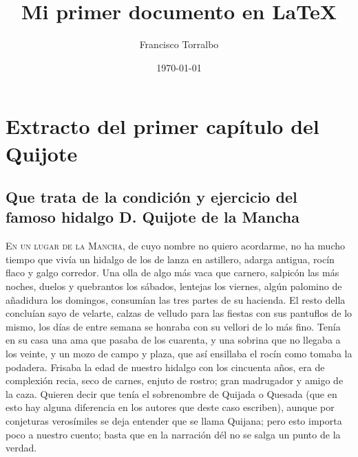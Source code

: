 \documentclass[a4paper, 12pt, twoside]{article} %
\title{Mi primer documento en \LaTeX}
\author{Francisco Torralbo}
\date{\today}
\begin{document}
\maketitle

\section{Extracto del primer capítulo del Quijote}

\subsection*{Que trata de la condición y ejercicio del famoso hidalgo D. Quijote de la Mancha}

\textsc{En un lugar de la Mancha}, de cuyo nombre no quiero acordarme, no ha mucho tiempo que vivía un hidalgo de los de lanza en astillero, adarga antigua, rocín flaco y galgo corredor. Una olla de algo más vaca que carnero, salpicón las más noches, duelos y quebrantos los sábados, lentejas los viernes, algún palomino de añadidura los domingos, consumían las tres partes de su hacienda. El resto della concluían sayo de velarte, calzas de velludo para las fiestas con sus pantuflos de lo mismo, los días de entre semana se honraba con su vellori de lo más fino. Tenía en su casa una ama que pasaba de los cuarenta, y una sobrina que no llegaba a los veinte, y un mozo de campo y plaza, que así ensillaba el rocín como tomaba la podadera. Frisaba la edad de nuestro hidalgo con los cincuenta años, era de complexión recia, seco de carnes, enjuto de rostro; gran madrugador y amigo de la caza. Quieren decir que tenía el sobrenombre de Quijada o Quesada (que en esto hay alguna diferencia en los autores que deste caso escriben), aunque por conjeturas verosímiles se deja entender que se llama Quijana; pero esto importa poco a nuestro cuento; basta que en la narración dél no se salga un punto de la verdad.
\end{document}
